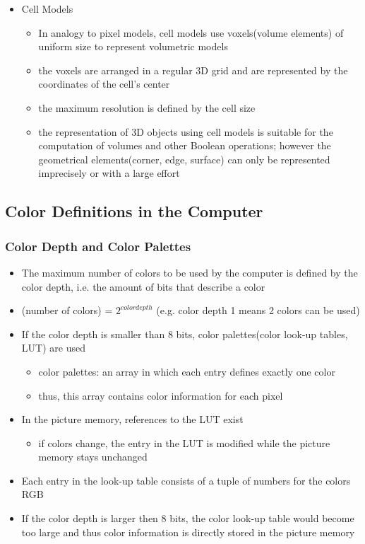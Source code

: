 \documentclass[12pt]{article}
\begin{document}
\begin{itemize}
	\item Cell Models
	\begin{itemize}
		\item In analogy to pixel models, cell models use voxels(volume elements) of uniform size to represent volumetric models
		\item the voxels are arranged in a regular 3D grid and are represented by the coordinates of the cell's center
		\item the maximum resolution is defined by the cell size
		\item the representation of 3D objects using cell models is suitable for the computation of volumes and other Boolean operations; however the geometrical elements(corner, edge, surface) can only be represented imprecisely or with a large effort
	\end{itemize}
\end{itemize}

\subsection{Color Definitions in the Computer}

\subsubsection*{Color Depth and Color Palettes}

\begin{itemize}
	\item The maximum number of colors to be used by the computer is defined by the color depth, i.e. the amount of bits that describe a color
	\item (number of colors) = $2^{color depth}$ (e.g. color depth 1 means 2 colors can be used)
	\item If the color depth is smaller than 8 bits, color palettes(color look-up tables, LUT) are used
	\begin{itemize}
		\item color palettes: an array in which each entry defines exactly one color
		\item thus, this array contains color information for each pixel
	\end{itemize}
	\item In the picture memory, references to the LUT exist
	\begin{itemize}
		\item if colors change, the entry in the LUT is modified while the picture memory stays unchanged
	\end{itemize}
	\item Each entry in the look-up table consists of a tuple of numbers for the colors RGB
	\item If the color depth is larger then 8 bits, the color look-up table would become too large and thus color information is directly stored in the picture memory
\end{itemize}
\end{document}

